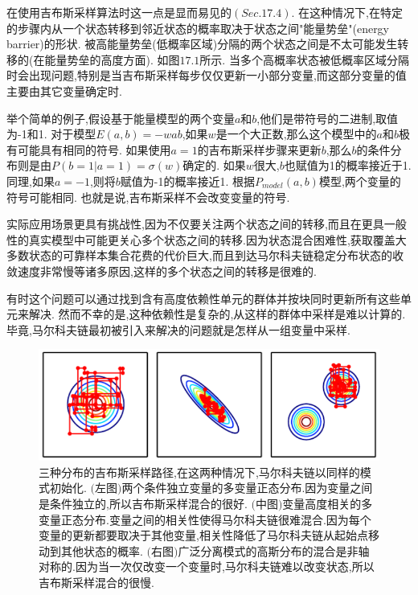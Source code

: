 在使用吉布斯采样算法时这一点是显而易见的$(Sec. 17.4)$.
在这种情况下,在特定的步骤内从一个状态转移到邻近状态的概率取决于状态之间"能量势垒"(energy barrier)的形状.
被高能量势垒(低概率区域)分隔的两个状态之间是不太可能发生转移的(在能量势垒的高度方面).
如图$17.1$所示.
当多个高概率状态被低概率区域分隔时会出现问题,特别是当吉布斯采样每步仅仅更新一小部分变量,而这部分变量的值主要由其它变量确定时.

举个简单的例子,假设基于能量模型的两个变量$a$和$b$,他们是带符号的二进制,取值为-1和1.
对于模型$E(a,b)=-wab$,如果$w$是一个大正数,那么这个模型中的$a$和$b$极有可能具有相同的符号.
如果使用$a=1$的吉布斯采样步骤来更新$b$,那么$b$的条件分布则是由$P(b=1|a=1)=\sigma(w)$确定的.
如果$w$很大,$b$也赋值为1的概率接近于1.
同理,如果$a=-1$,则将$b$赋值为-1的概率接近1.
根据$P_{model}(a,b)$模型,两个变量的符号可能相同.
也就是说,吉布斯采样不会改变变量的符号.

实际应用场景更具有挑战性,因为不仅要关注两个状态之间的转移,而且在更具一般性的真实模型中可能更关心多个状态之间的转移.因为状态混合困难性,获取覆盖大多数状态的可靠样本集合花费的代价巨大,而且到达马尔科夫链稳定分布状态的收敛速度非常慢等诸多原因,这样的多个状态之间的转移是很难的.

有时这个问题可以通过找到含有高度依赖性单元的群体并按块同时更新所有这些单元来解决.
然而不幸的是,这种依赖性是复杂的,从这样的群体中采样是难以计算的.
毕竟,马尔科夫链最初被引入来解决的问题就是怎样从一组变量中采样.

\begin{figure}[htbp]
	\centering
	\includegraphics[width=5in]{fig/chap17/chap17.1.png}
	\caption{三种分布的吉布斯采样路径,在这两种情况下,马尔科夫链以同样的模式初始化.
	$($左图$)$两个条件独立变量的多变量正态分布.因为变量之间是条件独立的,所以吉布斯采样混合的很好.
	$($中图$)$变量高度相关的多变量正态分布.变量之间的相关性使得马尔科夫链很难混合.因为每个变量的更新都要取决于其他变量,相关性降低了马尔科夫链从起始点移动到其他状态的概率.
	$($右图$)$广泛分离模式的高斯分布的混合是非轴对称的.因为当一次仅改变一个变量时,马尔科夫链难以改变状态,所以吉布斯采样混合的很慢.}
	\label{fig:chap17.1.png}
\end{figure}


